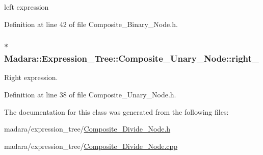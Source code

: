 left expression 



Definition at line 42 of file Composite\_\-Binary\_\-Node.h.

\hypertarget{classMadara_1_1Expression__Tree_1_1Composite__Unary__Node_a077b7bd1b52df6f5c6adfde735556a68}{
\subsubsection[{right\_\-}]{$\ast$ {\bf Madara::Expression\_\-Tree::Composite\_\-Unary\_\-Node::right\_\-}}}
\label{d3/dc7/classMadara_1_1Expression__Tree_1_1Composite__Unary__Node_a077b7bd1b52df6f5c6adfde735556a68}


Right expression. 



Definition at line 38 of file Composite\_\-Unary\_\-Node.h.



The documentation for this class was generated from the following files:\begin{DoxyCompactItemize}
\item 
madara/expression\_\-tree/\hyperlink{Composite__Divide__Node_8h}{Composite\_\-Divide\_\-Node.h}\item 
madara/expression\_\-tree/\hyperlink{Composite__Divide__Node_8cpp}{Composite\_\-Divide\_\-Node.cpp}\end{DoxyCompactItemize}

